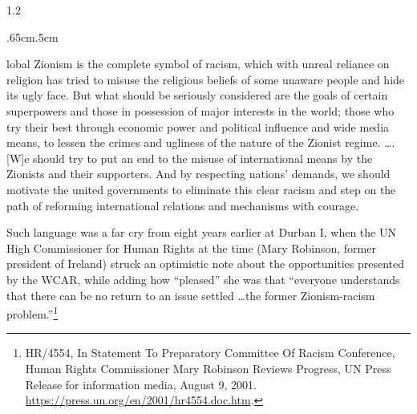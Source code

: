 \documentclass[../unravbook.tex]{subfiles}
\begin{document}
\begin{spacing}{1.2}
\begin{adjustwidth}{.65cm}{.5cm}
   \begin{singlespace}
    [G]lobal Zionism is the complete symbol of racism, which with unreal reliance on religion has tried to misuse the religious beliefs of some unaware people and hide its ugly face. But what should be seriously considered are the goals of certain superpowers and those in possession of major interests in the world; those who try their best through economic power and political influence and wide media means, to lessen the crimes and ugliness of the nature of the Zionist regime. \ldots. [W]e should try to put an end to the misuse of international means by the Zionists and their supporters. And by respecting nations' demands, we should motivate the united governments to eliminate this clear racism and step on the path of reforming international relations and mechanisms with courage.
    \end{singlespace}
\end{adjustwidth}

\noindent
Such language was a far cry from eight years earlier at Durban I, when the UN High Commissioner for Human Rights at the time (Mary Robinson, former president of Ireland) struck an optimistic note about the opportunities presented by the WCAR, while adding how ``pleased'' she was that ``everyone understands that there can be no return to an issue settled \ldots the former Zionism-racism problem.''\footnote{HR/4554, In Statement To Preparatory Committee Of Racism Conference, Human Rights Commissioner Mary Robinson Reviews Progress, UN Press Release for information media, August 9, 2001. \url{https://press.un.org/en/2001/hr4554.doc.htm}.} 


\end{spacing}
\end{document}
